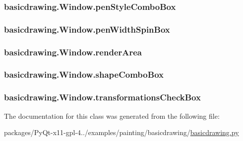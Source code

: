 \subsubsection[{pen\+Style\+Combo\+Box}]{\setlength{\rightskip}{0pt plus 5cm}basicdrawing.\+Window.\+pen\+Style\+Combo\+Box}\label{classbasicdrawing_1_1Window_acb088e6daa222452151e4cd43bd32dd8}
\hypertarget{classbasicdrawing_1_1Window_a3fa711ee62030f914847a12ca51c80a2}{}
\subsubsection[{pen\+Width\+Spin\+Box}]{\setlength{\rightskip}{0pt plus 5cm}basicdrawing.\+Window.\+pen\+Width\+Spin\+Box}\label{classbasicdrawing_1_1Window_a3fa711ee62030f914847a12ca51c80a2}
\hypertarget{classbasicdrawing_1_1Window_af8cab243455a0265b5e64ea7e568d977}{}
\subsubsection[{render\+Area}]{\setlength{\rightskip}{0pt plus 5cm}basicdrawing.\+Window.\+render\+Area}\label{classbasicdrawing_1_1Window_af8cab243455a0265b5e64ea7e568d977}
\hypertarget{classbasicdrawing_1_1Window_aa784567ae061928258830a7e7a64256b}{}
\subsubsection[{shape\+Combo\+Box}]{\setlength{\rightskip}{0pt plus 5cm}basicdrawing.\+Window.\+shape\+Combo\+Box}\label{classbasicdrawing_1_1Window_aa784567ae061928258830a7e7a64256b}
\hypertarget{classbasicdrawing_1_1Window_a5c70839bb918425cb43221a16c144689}{}
\subsubsection[{transformations\+Check\+Box}]{\setlength{\rightskip}{0pt plus 5cm}basicdrawing.\+Window.\+transformations\+Check\+Box}\label{classbasicdrawing_1_1Window_a5c70839bb918425cb43221a16c144689}


The documentation for this class was generated from the following file\+:\begin{DoxyCompactItemize}
\item 
packages/\+Py\+Qt-\/x11-\/gpl-\/4../examples/painting/basicdrawing/\hyperlink{basicdrawing_8py}{basicdrawing.\+py}\end{DoxyCompactItemize}
